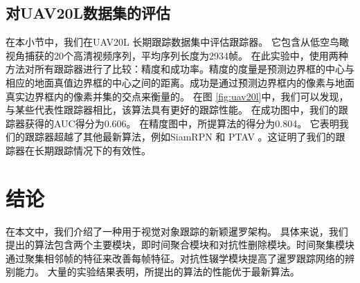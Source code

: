 \subsection{对UAV20L数据集的评估}
在本小节中，我们在UAV20L \cite{mueller2016benchmark} 长期跟踪数据集中评估跟踪器。
它包含从低空鸟瞰视角捕获的20个高清视频序列，平均序列长度为2934帧。
在此实验中，使用两种方法对所有跟踪器进行了比较：精度和成功率。精度的度量是预测边界框的中心与相应的地面真值边界框的中心之间的距离。成功是通过预测边界框内的像素与地面真实边界框内的像素并集的交点来衡量的。
在图 \ref{fig:uav20l}中，我们可以发现，与某些代表性跟踪器相比，该算法具有更好的跟踪性能。
在成功图中，我们的跟踪器获得的AUC得分为0.606。
在精度图中，所提算法的得分为0.804。
它表明我们的跟踪器超越了其他最新算法，例如SiamRPN \cite{SiamRPN} 和 PTAV \cite{fan2018parallel}。这证明了我们的跟踪器在长期跟踪情况下的有效性。
\section{结论}
在本文中，我们介绍了一种用于视觉对象跟踪的新颖暹罗架构。
具体来说，我们提出的算法包含两个主要模块，即时间聚合模块和对抗性删除模块。时间聚集模块通过聚集相邻帧的特征来改善每帧特征。对抗性辍学模块提高了暹罗跟踪网络的辨别能力。
大量的实验结果表明，所提出的算法的性能优于最新算法。